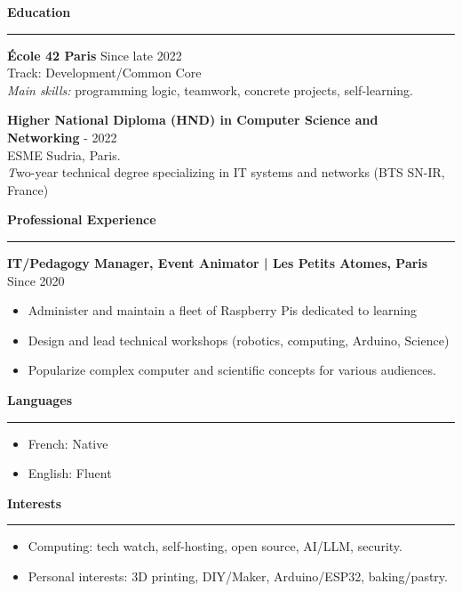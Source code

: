 \documentclass[10pt,a4paper]{article}
\newcommand{\cvsection}[1]{
      \vspace{0.8em}
      {\large\bfseries\textcolor{sectioncolor}{#1}}\\[-0.5em]
      \rule{\linewidth}{0.4pt}\vspace{0.4em}
    }
\begin{document}
\cvsection{Education}
\textbf{École 42 Paris} \hfill Since late 2022 \\
Track: Development/Common Core \\
\textit{Main skills:} programming logic, teamwork, concrete projects, self-learning.

\textbf{Higher National Diploma (HND) in Computer Science and Networking} \hfill - 2022 \\
ESME Sudria, Paris. \\
\textit Two-year technical degree specializing in IT systems and networks (BTS SN-IR, France)

\cvsection{Professional Experience}
\textbf{IT/Pedagogy Manager, Event Animator | Les Petits Atomes, Paris} \hfill Since 2020
\begin{itemize}
  \item Administer and maintain a fleet of Raspberry Pis dedicated to learning
  \item Design and lead technical workshops (robotics, computing, Arduino, Science)
  \item Popularize complex computer and scientific concepts for various audiences.
\end{itemize}

\cvsection{Languages}
\begin{itemize}
  \item French: Native
  \item English: Fluent
\end{itemize}

\cvsection{Interests}
\begin{itemize}
  \item Computing: tech watch, self-hosting, open source, AI/LLM, security.
  \item Personal interests: 3D printing, DIY/Maker, Arduino/ESP32, baking/pastry.
\end{itemize}
\end{document}
